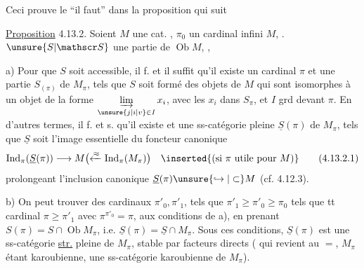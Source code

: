 \margin{$\unsure{\surd}$} Ceci prouve  le ``il faut'' dans la
proposition qui suit\unsure{:}

\uline{Proposition} 4.13.2. Soient $M$ une
cat. , $\pi_0$ un cardinal infini
 $M$, . $\unsure{S|\mathscr S}$ une
 partie de $\operatorname{Ob}M$, 
,

a) Pour que $S$ soit accessible, il f. et il
suffit qu'il existe un cardinal  $\pi$ et une partie
$S_{(\pi)}$ de $M_\pi$,  tels que
$S$ soit formé des objets de $M$ qui
sont isomorphes à un objet de la
forme $\underset{\unsure{j|i|v}\in I}{\underrightarrow{\lim}}\,x_i$, avec les $x_i$ dans $S_\pi$,
et $I$ grd devant $\pi$. En d'autres
termes, il f. et s. qu'il existe  et une  ss-catégorie
pleine $\underline S(\pi)$ de $M_\pi$, tels que
$\underline S$ soit l'image essentielle du
foncteur canonique  
\[
 \mathrm{Ind}_\pi(\underline S(\pi))\longrightarrow M
 \bigl(\xleftarrow{\approx}\mathrm{Ind}_\pi(M_\pi)\bigr)
 \quad\inserted{\text{(si }\pi\text{ utile pour }M\text{)}}\tag*{(4.13.2.1)}
\]
prolongeant l'inclusion canonique
$\underline S(\pi)\unsure{\hookrightarrow|\subset} M$ (cf. 4.12.3).

b)  On peut trouver des cardinaux
$\pi'_0,\pi'_1$, tels que $\pi'_1\geq\pi'_0\geq\pi_0$
 tels que  tt cardinal $\pi\geq\pi'_1$ avec
$\pi^{\pi'_0}=\pi$,   aux conditions
de a), en prenant $S(\pi)=S\cap\operatorname{Ob}M_\pi$,
i.e. $\underline S(\pi)=\underline S\cap M_\pi$.  Sous ces conditions, 
$\underline S(\pi)$ est une ss-catégorie \uline{str.} pleine de $M_\pi$,
stable  par facteurs directs (
qui revient au $=$, $M_\pi$ étant karoubienne,
une ss-catégorie karoubienne de $M_\pi$).

